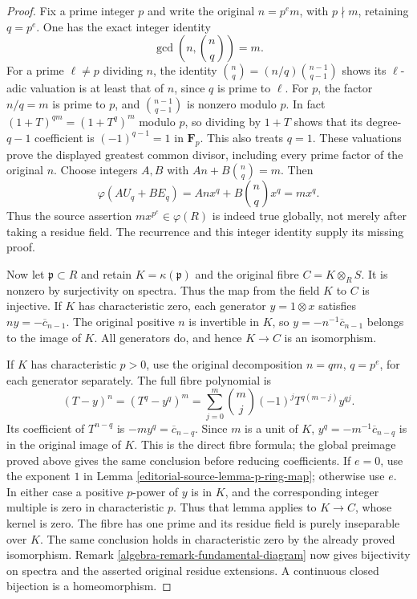 \begin{proof}
Fix a prime integer $p$ and write
the original $n=p^e m$, with
$p\nmid m$, retaining $q=p^e$.
One has the exact integer identity
$$
\gcd\left(n,\binom nq\right)=m.
$$
For a prime $\ell\neq p$ dividing
$n$, the identity
$\binom nq=(n/q)\binom{n-1}{q-1}$
shows its $\ell$-adic valuation is
at least that of $n$, since
$q$ is prime to $\ell$.
For $p$, the factor $n/q=m$
is prime to $p$, and
$\binom{n-1}{q-1}$ is nonzero
modulo $p$. In fact
$(1+T)^{qm}=(1+T^q)^m$ modulo
$p$, so dividing by $1+T$ shows
that its degree-$q-1$ coefficient
is $(-1)^{q-1}=1$ in
$\mathbf F_p$. This also treats
$q=1$. These valuations prove
the displayed greatest common
divisor, including every prime
factor of the original $n$.
Choose integers $A,B$ with
$An+B\binom nq=m$. Then
$$
\varphi(AU_q+BE_q)
=A n x^q+B\binom nq x^q=m x^q.
$$
Thus the source assertion
$m x^{p^e}\in\varphi(R)$ is
indeed true globally, not merely
after taking a residue field.
The recurrence and this integer
identity supply its missing proof.

Now let $\mathfrak p\subset R$
and retain $K=\kappa(\mathfrak p)$
and the original fibre
$C=K\otimes_R S$. It is nonzero
by surjectivity on spectra. Thus
the map from the field $K$ to $C$
is injective. If $K$ has
characteristic zero, each generator
$y=1\otimes x$ satisfies
$n y=-\overline c_{n-1}$.
The original positive $n$ is
invertible in $K$, so
$y=-n^{-1}\overline c_{n-1}$
belongs to the image of $K$.
All generators do, and hence
$K\to C$ is an isomorphism.

If $K$ has characteristic $p>0$,
use the original decomposition
$n=q m$, $q=p^e$, for each
generator separately. The full
fibre polynomial is
$$
(T-y)^n=(T^q-y^q)^m
=\sum_{j=0}^m\binom mj(-1)^j
T^{q(m-j)}y^{qj}.
$$
Its coefficient of $T^{n-q}$
is $-m y^q=\overline c_{n-q}$.
Since $m$ is a unit of $K$,
$y^q=-m^{-1}\overline c_{n-q}$
is in the original image of $K$.
This is the direct fibre formula;
the global preimage proved above
gives the same conclusion before
reducing coefficients.
If $e=0$, use the exponent $1$
in Lemma \ref{editorial-source-lemma-p-ring-map};
otherwise use $e$. In either
case a positive $p$-power of $y$
is in $K$, and the corresponding
integer multiple is zero in
characteristic $p$. Thus that
lemma applies to $K\to C$, whose
kernel is zero. The fibre has
one prime and its residue field
is purely inseparable over $K$.
The same conclusion holds in
characteristic zero by the
already proved isomorphism.
Remark \ref{algebra-remark-fundamental-diagram}
now gives bijectivity on spectra
and the asserted original residue
extensions. A continuous closed
bijection is a homeomorphism.


\end{proof}

